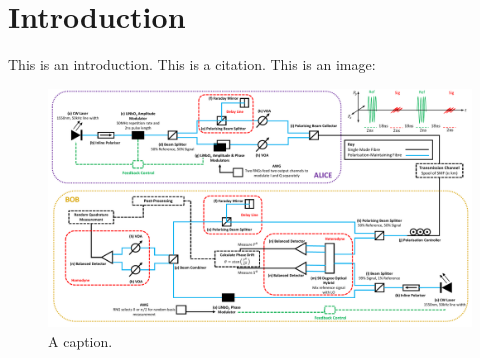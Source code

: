 \section{Introduction}

This is an introduction. This is a citation\cite{my_citation}. This is an image:

\clearpage
\begin{figure}
\includegraphics[width=\textwidth]{images/image.pdf}
\caption{A caption.}
\label{fig::caption}
\end{figure}
\clearpage

